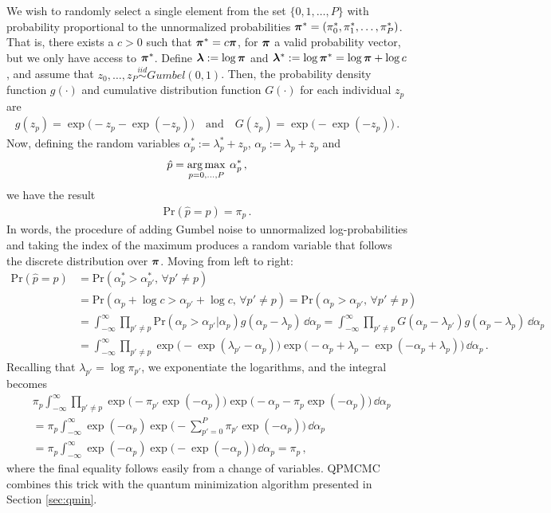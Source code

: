 \documentclass[12pt]{article} %
\newcommand{\argmax}{\operatornamewithlimits{arg\,max}}
\begin{document}
We wish to randomly select a single element from the set $\{0,1,\dots,P\}$ with probability proportional to the unnormalized probabilities $\boldsymbol{\pi}^*=(\pi_0^*,\pi_1^*,\dots,\pi_P^*)$.  That is, there exists a $c>0$ such that $\boldsymbol{\pi}^* = c \boldsymbol{\pi}$, for $\boldsymbol{\pi}$ a valid probability vector, but we only have access to $\boldsymbol{\pi}^*$.  Define $\boldsymbol{\lambda}:= \log \boldsymbol{\pi}$ and $\boldsymbol{\lambda}^*:= \log \boldsymbol{\pi}^*=\log\boldsymbol{\pi} + \log c$,  and assume that $z_0,\dots,z_P\stackrel{iid}{\sim}Gumbel(0,1)$. Then, the probability density function $g(\cdot)$ and cumulative distribution function $G(\cdot)$ for each individual $z_p$ are
\begin{align*}
g(z_p) = \exp\big(-z_p- \exp(-z_p)\big)  \quad \mbox{and} \quad G(z_p) = \exp \big( -\exp(-z_p) \big)\, .
\end{align*}
Now, defining the random variables $\alpha^*_p:=\lambda^*_p+z_p$, $\alpha_p:=\lambda_p+z_p$ and  
\begin{align*}
\hat{p} = \argmax_{p=0,\dots,P}\: \alpha^*_p \, ,
\end{align*}
we have the result
\begin{align*}
\mbox{Pr} (\hat{p} = p) = \pi_p \, .
\end{align*}
In words, the procedure of adding Gumbel noise to unnormalized log-probabilities and taking the index of the maximum produces a random variable that follows the discrete distribution over $\boldsymbol{\pi}$.  Moving from left to right:
\begin{align*}
\mbox{Pr} (\hat{p} = p) &= \mbox{Pr} (\alpha^*_p > \alpha^*_{p'}, \, \forall p' \neq p ) \\
&= \mbox{Pr} (\alpha_p +\log c > \alpha_{p'} + \log c, \, \forall p' \neq p ) 
= \mbox{Pr} (\alpha_p  > \alpha_{p'} , \, \forall p' \neq p ) \\
&= \int_{-\infty}^\infty \prod_{p'\neq p} \mbox{Pr} (\alpha_p > \alpha_{p'}| \alpha_p) g(\alpha_p-\lambda_p) \, \dd \alpha_p 
= \int_{-\infty}^\infty \prod_{p'\neq p} G(\alpha_p-\lambda_{p'}) g(\alpha_p-\lambda_p) \, \dd \alpha_p \\
&=  \int_{-\infty}^\infty  \prod_{p'\neq p} \exp\big( -\exp(\lambda_{p'}-\alpha_p)\big) \exp\big(-\alpha_p+\lambda_p - \exp(-\alpha_p+\lambda_p) \big) \, \dd \alpha_p \, .
\end{align*}
Recalling that $\lambda_{p'}=\log \pi_{p'}$, we exponentiate the logarithms, and the integral becomes
\begin{align*}
& \pi_p \int_{-\infty}^\infty  \prod_{p'\neq p} \exp\big( -\pi_{p'}\exp(-\alpha_p)\big) \exp  \big(-\alpha_p - \pi_p\exp(-\alpha_p) \big) \, \dd \alpha_p \\
&= \pi_p \int_{-\infty}^\infty \exp  (-\alpha_p ) \exp\big( -\sum_{p'=0}^P\pi_{p'}\exp(-\alpha_p)\big)  \, \dd \alpha_p  \\
&= \pi_p \int_{-\infty}^\infty \exp  (-\alpha_p ) \exp\big( -\exp(-\alpha_p)\big)  \, \dd \alpha_p  = \pi_p \, ,
\end{align*}
where the final equality follows easily from a change of variables.  QPMCMC combines this trick with the quantum minimization algorithm presented in Section \ref{sec:qmin}.
\end{document}

